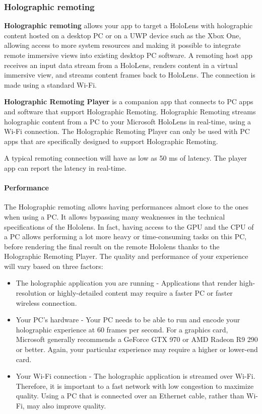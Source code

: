 \subsubsection{ Holographic remoting }

\textbf {Holographic remoting } allows your app to target a HoloLens with holographic content hosted on a desktop PC or on a UWP device such as the Xbox One, allowing access to more system resources and making it possible to integrate remote immersive views into existing desktop PC software. A remoting host app receives an input data stream from a HoloLens, renders content in a virtual immersive view, and streams content frames back to HoloLens. The connection is made using a standard Wi-Fi. 

\textbf {Holographic Remoting Player} is a companion app that connects to PC apps and software that support Holographic Remoting. Holographic Remoting streams holographic content from a PC to your Microsoft HoloLens in real-time, using a Wi-Fi connection. The Holographic Remoting Player can only be used with PC apps that are specifically designed to support Holographic Remoting.

A typical remoting connection will have as low as 50 ms of latency. The player app can report the latency in real-time.

\paragraph{Performance}

The Holographic remoting allows having performances almost close to the ones when using a PC. It allows bypassing many weaknesses in the technical specifications of the Hololens. In fact, having access to the GPU and the CPU of a PC allows performing a lot more heavy or time-consuming tasks on this PC, before rendering the final result on the remote Hololens thanks to the Holographic Remoting Player.
The quality and performance of your experience will vary based on three factors:
\begin{itemize}

\item  The holographic application you are running - Applications that render high-resolution or highly-detailed content may require a faster PC or faster wireless connection.

\item Your PC's hardware - Your PC needs to be able to run and encode your holographic experience at 60 frames per second. For a graphics card, Microsoft generally recommends a GeForce GTX 970 or AMD Radeon R9 290 or better. Again, your particular experience may require a higher or lower-end card.

\item Your Wi-Fi connection - The holographic application is streamed over Wi-Fi. Therefore, it is important to a fast network with low congestion to maximize quality. Using a PC that is connected over an Ethernet cable, rather than Wi-Fi, may also improve quality.

\end{itemize}
